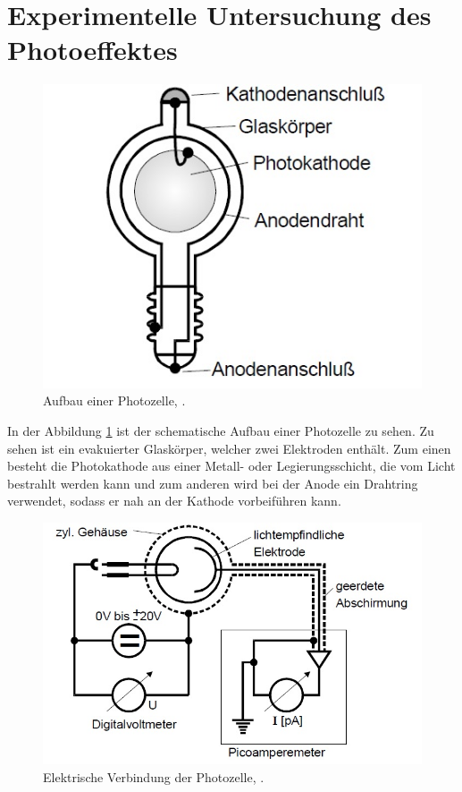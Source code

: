 \section{Experimentelle Untersuchung des Photoeffektes}
\begin{figure}[h!]
	\centering
	\includegraphics[width=0.5\linewidth]{AufbauPhotozelle.jpg}
	\caption{Aufbau einer Photozelle, \cite[4]{anleitung500}.}
	\label{fig:aufbauphotozelle}
\end{figure}
In der Abbildung \ref{fig:aufbauphotozelle} ist der schematische Aufbau einer Photozelle zu sehen. Zu sehen ist ein evakuierter Glaskörper, welcher zwei Elektroden enthält. Zum einen besteht die Photokathode aus einer Metall- oder Legierungsschicht, die vom Licht bestrahlt werden kann und zum anderen wird bei der Anode ein Drahtring verwendet, sodass er nah an der Kathode vorbeiführen kann.

\begin{figure}[h!]
	\centering
	\includegraphics[width=0.7\linewidth]{ElektrischesSchaltbild.jpg}
	\caption{Elektrische Verbindung der Photozelle, \cite[5]{anleitung500}.}
	\label{fig:elektrischesschaltbild}
\end{figure}

